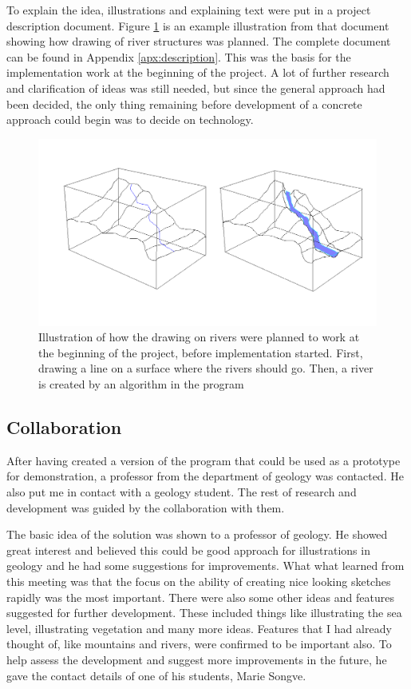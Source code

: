 \documentclass[a4paper,12pt]{report}
\begin{document}
To explain the idea, illustrations and explaining text were put in a project description document. Figure \ref{fig:riverDesription} is an example illustration from that document showing how drawing of river structures was planned. The complete document can be found in Appendix \ref{apx:description}. This was the basis for the implementation work at the beginning of the project. A lot of further research and clarification of ideas was still needed, but since the general approach had been decided, the only thing remaining before development of a concrete approach could begin was to decide on technology.

\begin{figure}
 \includegraphics[width=\linewidth]{thesis/river.png}
 \caption{Illustration of how the drawing on rivers were planned to work at the beginning of the project, before implementation started. First, drawing a line on a surface where the rivers should go. Then, a river is created by an algorithm in the program}
 \label{fig:riverDesription}
\end{figure}


\subsection{Collaboration}
After having created a version of the program that could be used as a prototype for demonstration, a professor from the department of geology was contacted. He also put me in contact with a geology student. The rest of research and development was guided by the collaboration with them. 

The basic idea of the solution was shown to a professor of geology. He showed great interest and believed this could be good approach for illustrations in geology and he had some suggestions for improvements. What what learned from this meeting was that the focus on the ability of creating nice looking sketches rapidly was the most important. There were also some other ideas and features suggested for further development. These included things like illustrating the sea level, illustrating vegetation and many more ideas. Features that I had already thought of, like mountains and rivers, were confirmed to be important also. To help assess the development and suggest more improvements in the future, he gave the contact details of one of his students, Marie Songve.
\end{document}
